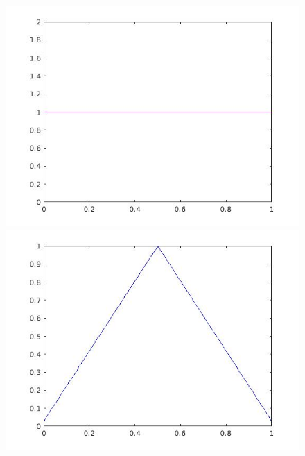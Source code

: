 \documentclass[a4paper,11pt]{article}
\begin{document}
\begin{figure}[!hp]
\centering
\begin{minipage}{.5\textwidth}
  \centering
  \includegraphics[width=1\linewidth]{images/lab2_1.jpg}
\end{minipage}%
\begin{minipage}{.5\textwidth}
  \centering
  \includegraphics[width=1\linewidth]{images/lab2_2.jpg}
\end{minipage}
\end{figure}

\newpage
\end{document}
